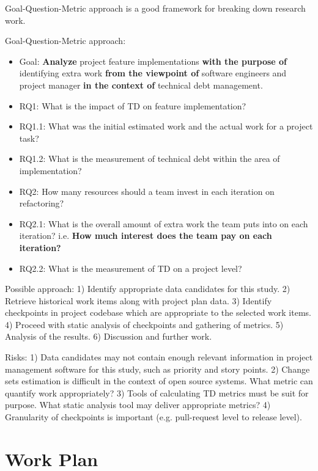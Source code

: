 \documentclass{mprop}
\begin{document}
Goal-Question-Metric approach is a good framework for breaking down research work.

Goal-Question-Metric approach:
\begin{itemize}
	\item Goal: \textbf{Analyze} project feature implementations \textbf{with the purpose of} identifying extra work \textbf{from the viewpoint of} software engineers and project manager \textbf{in the context of} technical debt management.
	\item RQ1: What is the impact of TD on feature implementation?
	\item RQ1.1: What was the initial estimated work and the actual work for a project task?
	\item RQ1.2: What is the measurement of technical debt within the area of implementation?
	\item RQ2: How many resources should a team invest in each iteration on refactoring?
	\item RQ2.1: What is the overall amount of extra work the team puts into on each iteration? i.e. \textbf{How much interest does the team pay on each iteration?}
	\item RQ2.2: What is the measurement of TD on a project level?
\end{itemize}

Possible approach:
1) Identify appropriate data candidates for this study.
2) Retrieve historical work items along with project plan data.
3) Identify checkpoints in project codebase which are appropriate to the selected work items.
4) Proceed with static analysis of checkpoints and gathering of metrics.
5) Analysis of the results.
6) Discussion and further work.

Risks:
1) Data candidates may not contain enough relevant information in project management software for this study, such as priority and story points. 
2) Change sets estimation is difficult in the context of open source systems. What metric can quantify work appropriately?
3) Tools of calculating TD metrics must be suit for purpose. What static analysis tool may deliver appropriate metrics?
4) Granularity of checkpoints is important (e.g. pull-request level to release level).

\section{Work Plan}
\end{document}
